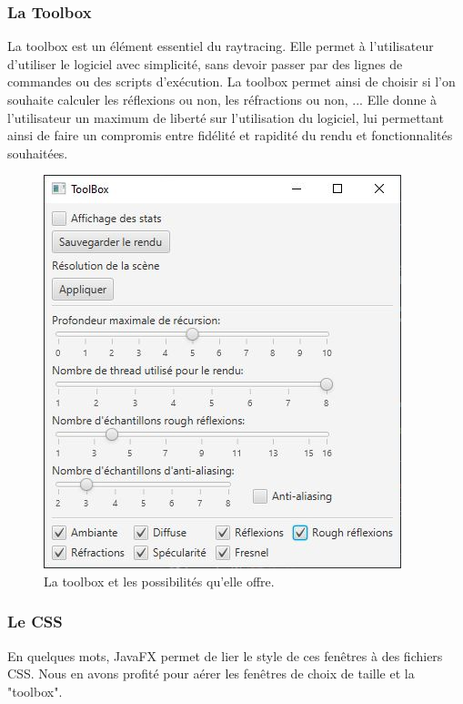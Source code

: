 \subsubsection{La Toolbox}

La toolbox est un élément essentiel du raytracing. Elle permet à l'utilisateur d'utiliser le logiciel avec simplicité, sans devoir passer par des lignes de commandes ou des scripts d'exécution.
La toolbox permet ainsi de choisir si l'on souhaite calculer les réflexions ou non, les réfractions ou non, ... Elle donne à l'utilisateur un maximum de liberté sur
l'utilisation du logiciel, lui permettant ainsi de faire un compromis entre fidélité et rapidité du rendu et fonctionnalités souhaitées.

\begin{figure}[h]
   \begin{center}
       \includegraphics[scale=0.8]{img/rt/toolbox.jpg}
   \end{center}
   \caption{La toolbox et les possibilités qu'elle offre.}
\end{figure}
\FloatBarrier



\subsubsection{Le CSS}

En quelques mots, JavaFX permet de lier le style de ces fenêtres à des fichiers CSS. Nous en avons profité pour aérer les fenêtres de choix de taille et la "toolbox".

